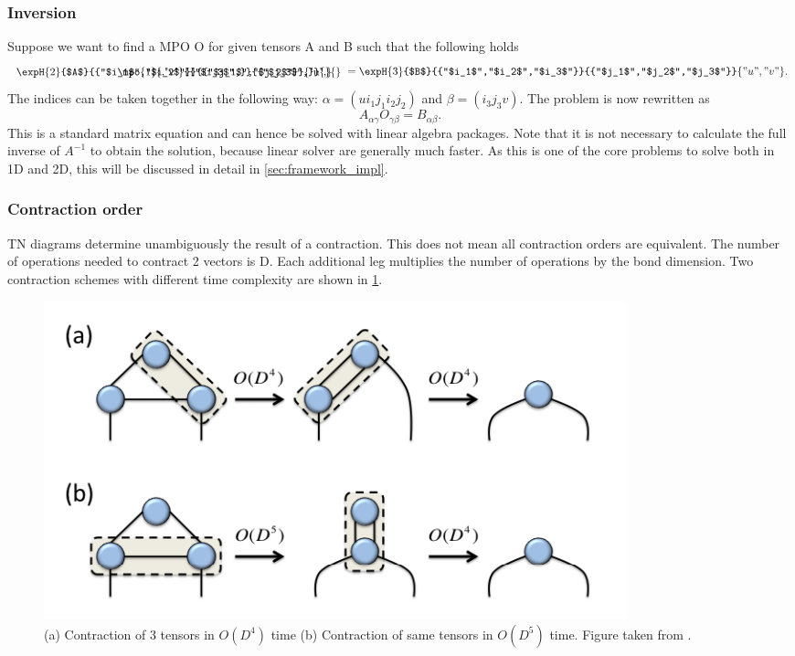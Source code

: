 \subsubsection{Inversion}

\def \figone {\expH{2}{$A$}{{"$i_1$","$i_2$"}}{{"$j_1$","$j_2$"}}{{"u",}}}
\def \figthree {\expH{3}{$B$}{{"$i_1$","$i_2$","$i_3$"}}{{"$j_1$","$j_2$","$j_3$"}}{{"u","v"}}}
\def \figtwo {\mpo{1}{{,"v"}}{{"$i_3$",}}{{"$j_3$",}}{}{}}

Suppose we want to find a \Gls{MPO} O for given tensors A and B such that the following holds
\begin{equation}
    \combineTikz{ \figone }{\figtwo}{1.8} =  \figthree .
\end{equation}
The indices can be taken together in the following way: $\alpha = (u i_1 j_1  i_2 j_2)$ and $\beta = (i_3 j_3 v)$. The problem is now rewritten as
\begin{equation}
    A_{\alpha \gamma} O_{\gamma \beta} = B_{\alpha \beta} .
\end{equation}
This is a standard matrix equation and can hence be solved with linear algebra packages. Note that it is not necessary to calculate the full inverse of $A^{-1}$ to obtain the solution, because linear solver are generally much faster. As this is one of the core problems to solve both in 1D and 2D, this will be discussed in detail in \cref{sec:framework_impl}.

\subsubsection{Contraction order}

\Gls{TN} diagrams determine unambiguously the result of a contraction. This does not mean all contraction orders are equivalent. The number of operations needed to contract 2 vectors is D. Each additional leg multiplies the number of operations by the bond dimension. Two contraction schemes with different time complexity are shown in \cref{fig:tnalgs:cont_ord}.

\begin{figure}[!htbp]
    \center
    \includegraphics[width=0.8 \textwidth]{Figuren/tnalgs/contraction_order.png}
    \caption{ (a) Contraction of 3 tensors in $O(D^4)$ time (b) Contraction of same tensors in $O(D^5)$ time. Figure taken from \cite{Orus2014}.  }
    \label{fig:tnalgs:cont_ord}
\end{figure}